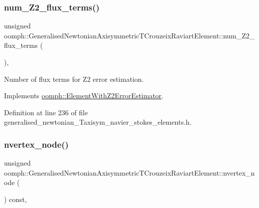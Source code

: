 \subsubsection{\texorpdfstring{num\+\_\+\+Z2\+\_\+flux\+\_\+terms()}{num\_Z2\_flux\_terms()}}
{\footnotesize\ttfamily unsigned oomph\+::\+Generalised\+Newtonian\+Axisymmetric\+T\+Crouzeix\+Raviart\+Element\+::num\+\_\+\+Z2\+\_\+flux\+\_\+terms (\begin{DoxyParamCaption}{ }\end{DoxyParamCaption})\hspace{0.3cm}{\ttfamily [inline]}, {\ttfamily [virtual]}}



Number of \textquotesingle{}flux\textquotesingle{} terms for Z2 error estimation. 



Implements \hyperlink{classoomph_1_1ElementWithZ2ErrorEstimator_ae82c5728902e13da31be19c390fc28e3}{oomph\+::\+Element\+With\+Z2\+Error\+Estimator}.



Definition at line 236 of file generalised\+\_\+newtonian\+\_\+\+Taxisym\+\_\+navier\+\_\+stokes\+\_\+elements.\+h.

\mbox{\label{classoomph_1_1GeneralisedNewtonianAxisymmetricTCrouzeixRaviartElement_a8f49d7d8329670f70c356aab38ab86be}} 
\subsubsection{\texorpdfstring{nvertex\+\_\+node()}{nvertex\_node()}}
{\footnotesize\ttfamily unsigned oomph\+::\+Generalised\+Newtonian\+Axisymmetric\+T\+Crouzeix\+Raviart\+Element\+::nvertex\+\_\+node (\begin{DoxyParamCaption}{ }\end{DoxyParamCaption}) const\hspace{0.3cm}{\ttfamily [inline]}, {\ttfamily [virtual]}}



